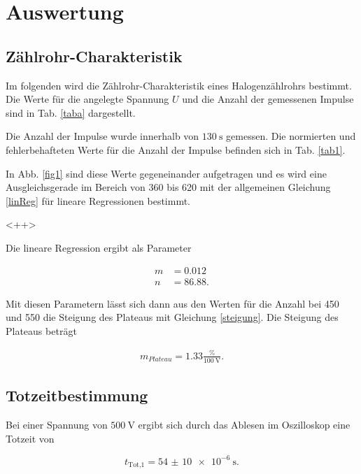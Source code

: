 \section{Auswertung}
\label{sec:Auswertung}


\subsection{Zählrohr-Charakteristik}

Im folgenden wird die Zählrohr-Charakteristik eines Halogenzählrohrs bestimmt. Die Werte für die angelegte Spannung $U$ und die Anzahl der gemessenen Impulse sind in Tab. \ref{taba} dargestellt. 



Die Anzahl der Impulse wurde innerhalb von $\SI{130}{\second}$ gemessen. 
Die normierten und fehlerbehafteten Werte für die Anzahl der Impulse befinden sich in Tab. \ref{tab1}. 



In Abb. \ref{fig1} sind diese Werte gegeneinander aufgetragen und es wird eine Ausgleichsgerade im Bereich von \num{360} bis \num{620} mit der allgemeinen Gleichung \eqref{linReg} für lineare Regressionen bestimmt. 

<++> %

Die lineare Regression ergibt als Parameter

\begin{align*} 
   m &= 0.012 \\
   n &= 86.88.
\end{align*}

Mit diesen Parametern lässt sich dann aus den Werten für die Anzahl bei \num{450} und \num{550} die Steigung des Plateaus mit Gleichung \eqref{steigung}.
Die Steigung des Plateaus beträgt 

\begin{align*} 
    m_{Plateau} = 1.33 \frac{\si{\percent}}{\SI{100}{\volt}}.
\end{align*}

\subsection{Totzeitbestimmung}

Bei einer Spannung von $\SI{500}{\volt}$ ergibt sich durch das Ablesen im Oszilloskop eine Totzeit von 

\begin{equation*}
    t_\text{Tot,1} = \SI{54(10)e-6}{\second}.
\end{equation*}

